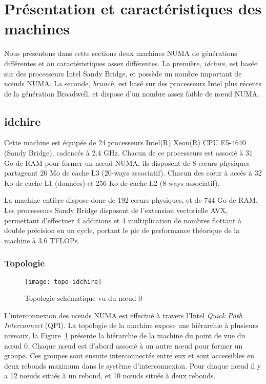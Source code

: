 \section{Présentation et caractéristiques des machines}\label{sec:contribs:machines}

Nous présentons dans cette sections deux machines NUMA de générations différentes et au caractéristiques assez différentes.
La première, \emph{idchire}, est basée sur des processeurs Intel Sandy Bridge, et possède un nombre important de nœuds NUMA.
La seconde, \emph{brunch}, est basé sur des processeurs Intel plus récents de la génération Broadwell, et dispose d'un nombre assez faible de nœud NUMA.

\subsection{idchire}\label{sec:contribs:machines:idchire}

Cette machine est équipée de 24 processeurs Intel(R) Xeon(R) CPU E5-4640 (Sandy Bridge), cadencés à 2.4 GHz.
Chacun de ce processeurs est associé à 31 Go de RAM pour former un nœud NUMA, ils disposent de 8 cœurs physiques partageant 20 Mo de cache L3 (20-ways associatif).
Chacun des cœur à accès à 32 Ko de cache L1 (données) et 256 Ko de cache L2 (8-ways associatif).

La machine entière dispose donc de 192 cœurs physiques, et de 744 Go de RAM.
Les processeurs Sandy Bridge disposent de l'extension vectorielle AVX, permettant d'effectuer 4 additions et 4 multiplication de nombres flottant à double précision en un cycle, portant le pic de performance théorique de la machine à 3.6 TFLOPs.

\subsubsection{Topologie}

\begin{figure}[ht]
  \centering
  \texttt{[image: topo-idchire]}
  \caption{Topologie schématique vu du nœud 0}\label{fig:contribs:machines:idchire:topo-liens}
\end{figure}

L'interconnexion des nœuds NUMA est effectué à travers l'Intel \emph{Quick Path Interconnect} (QPI).
La topologie de la machine expose une hiérarchie à plusieurs niveaux, la Figure~\ref{fig:contribs:machines:idchire:topo-liens} présente la hiérarchie de la machine du point de vue du nœud 0.
Chaque nœud est d'abord associé à un autre nœud pour former un groupe. Ces groupes sont ensuite interconnectés entre eux et sont accessibles en deux rebonds maximum dans le système d'interconnexion.
Pour chaque nœud il y a 12 nœuds situés à un rebond, et 10 nœuds situés à deux rebonds.


